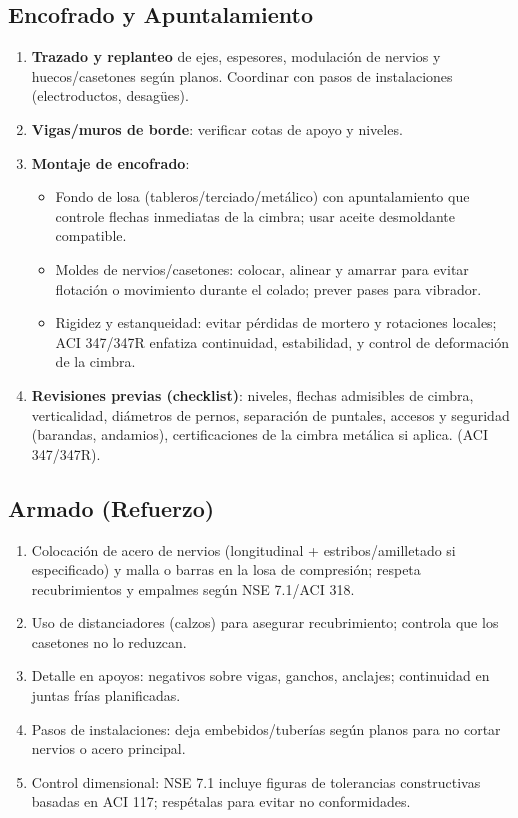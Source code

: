 \documentclass[12pt]{article}
\begin{document}
	
	\subsection{ Encofrado y Apuntalamiento}
	\begin{enumerate}
		\item \textbf{Trazado y replanteo} de ejes, espesores, modulación de nervios y huecos/casetones según planos. Coordinar con pasos de instalaciones (electroductos, desagües).
		\item \textbf{Vigas/muros de borde}: verificar cotas de apoyo y niveles.
		\item \textbf{Montaje de encofrado}: 
		\begin{itemize}
			\item Fondo de losa (tableros/terciado/metálico) con apuntalamiento que controle flechas inmediatas de la cimbra; usar aceite desmoldante compatible.
			\item Moldes de nervios/casetones: colocar, alinear y amarrar para evitar flotación o movimiento durante el colado; prever pases para vibrador.
			\item Rigidez y estanqueidad: evitar pérdidas de mortero y rotaciones locales; ACI 347/347R enfatiza continuidad, estabilidad, y control de deformación de la cimbra.
		\end{itemize}
		\item \textbf{Revisiones previas (checklist)}: niveles, flechas admisibles de cimbra, verticalidad, diámetros de pernos, separación de puntales, accesos y seguridad (barandas, andamios), certificaciones de la cimbra metálica si aplica. (ACI 347/347R).
	\end{enumerate}
	
	\subsection{ Armado (Refuerzo)}
	\begin{enumerate}
		\item Colocación de acero de nervios (longitudinal + estribos/amilletado si especificado) y malla o barras en la losa de compresión; respeta recubrimientos y empalmes según NSE 7.1/ACI 318.
		\item Uso de distanciadores (calzos) para asegurar recubrimiento; controla que los casetones no lo reduzcan.
		\item Detalle en apoyos: negativos sobre vigas, ganchos, anclajes; continuidad en juntas frías planificadas.
		\item Pasos de instalaciones: deja embebidos/tuberías según planos para no cortar nervios o acero principal.
		\item Control dimensional: NSE 7.1 incluye figuras de tolerancias constructivas basadas en ACI 117; respétalas para evitar no conformidades.
	\end{enumerate}
	
\end{document}
